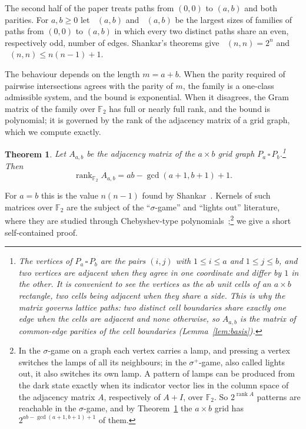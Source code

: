 \documentclass[11pt]{amsart}
\newtheorem{introthm}{Theorem}
\theoremstyle{definition}
\theoremstyle{remark}
\numberwithin{equation}{section}
\newcommand{\F}{\mathbb{F}}
\DeclareMathOperator{\rank}{rank}
\DeclareMathOperator{\Meven}{M_{ev}}
\DeclareMathOperator{\Modd}{M_{od}}
\begin{document}
The second half of the paper treats paths from $(0,0)$ to $(a,b)$ and both parities. For $a,b\ge0$ let $\Meven(a,b)$ and $\Modd(a,b)$ be the largest sizes of families of paths from $(0,0)$ to $(a,b)$ in which every two distinct paths share an even, respectively odd, number of edges. Shankar's theorems give $\Meven(n,n)=2^n$ and $\Modd(n,n)\le n(n-1)+1$.

The behaviour depends on the length $m=a+b$. When the parity required of pairwise intersections agrees with the parity of $m$, the family is a one-class admissible system, and the bound is exponential. When it disagrees, the Gram matrix of the family over $\F_2$ has full or nearly full rank, and the bound is polynomial; it is governed by the rank of the adjacency matrix of a grid graph, which we compute exactly.

\begin{introthm}\label{thm:C}
Let $A_{a,b}$ be the adjacency matrix of the $a\times b$ grid graph $P_a\,\square\,P_b$.\footnote{The vertices of $P_a\,\square\,P_b$ are the pairs $(i,j)$ with $1\le i\le a$ and $1\le j\le b$, and two vertices are adjacent when they agree in one coordinate and differ by $1$ in the other. It is convenient to see the vertices as the $ab$ unit cells of an $a\times b$ rectangle, two cells being adjacent when they share a side. This is why the matrix governs lattice paths: two distinct cell boundaries share exactly one edge when the cells are adjacent and none otherwise, so $A_{a,b}$ is the matrix of common-edge parities of the cell boundaries (Lemma~\ref{lem:basis}).} Then
\[
\rank_{\F_2}A_{a,b}=ab-\gcd(a+1,b+1)+1 .
\]
\end{introthm}

For $a=b$ this is the value $n(n-1)$ found by Shankar~\cite{Sh}. Kernels of such matrices over $\F_2$ are the subject of the ``$\sigma$-game'' and ``lights out'' literature, where they are studied through Chebyshev-type polynomials~\cite{Sutner89,Sutner00,GKT};\footnote{In the $\sigma$-game on a graph each vertex carries a lamp, and pressing a vertex switches the lamps of all its neighbours; in the $\sigma^+$-game, also called lights out, it also switches its own lamp. A pattern of lamps can be produced from the dark state exactly when its indicator vector lies in the column space of the adjacency matrix $A$, respectively of $A+I$, over $\F_2$. So $2^{\rank A}$ patterns are reachable in the $\sigma$-game, and by Theorem~\ref{thm:C} the $a\times b$ grid has $2^{ab-\gcd(a+1,b+1)+1}$ of them.} we give a short self-contained proof.
\end{document}
